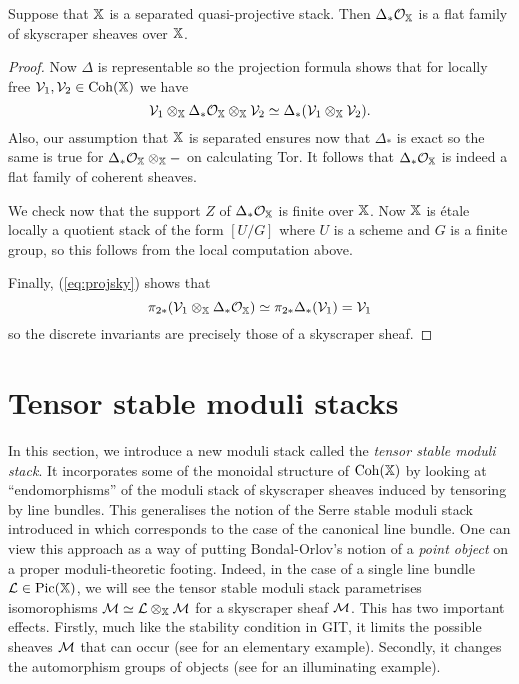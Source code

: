 \documentclass[12pt]{amsart}
\begin{document}
\begin{proposition} \label{prop:universalsky}
Suppose that $\mathbb{X}$ is a separated quasi-projective stack. Then $\Delta_* \mathcal{O}_{\mathbb{X}}$ is a flat family of skyscraper sheaves over $\mathbb{X}$. 
\end{proposition}
\begin{proof}
Now $\Delta$ is representable so the projection formula shows that for locally free $\mathcal{V}_1,\mathcal{V}_2 \in \operatorname{Coh}(\mathbb{X})$ we have
\begin{equation} \mathcal{V}_1 \otimes_{\mathbb{X}} \Delta_* \mathcal{O}_{\mathbb{X}} \otimes_{\mathbb{X}} \mathcal{V}_2 \simeq \Delta_*(\mathcal{V}_1 \otimes_{\mathbb{X}} \mathcal{V}_2) .
\label{eq:projsky}
\end{equation}
Also, our assumption that $\mathbb{X}$ is separated ensures now that $\Delta_*$ is exact so the same is true for $\Delta_* \mathcal{O}_{\mathbb{X}} \otimes_{\mathbb{X}} -$ on calculating Tor. It follows that $\Delta_* \mathcal{O}_{\mathbb{X}}$ is indeed a flat family of coherent sheaves. 

We check now that the support $Z$ of $\Delta_* \mathcal{O}_{\mathbb{X}}$ is finite over $\mathbb{X}$. Now $\mathbb{X}$ is \'etale locally  a quotient stack of the form $[U/G]$ where $U$ is a scheme and $G$ is a finite group, so this follows from the local computation above. 

Finally, (\ref{eq:projsky}) shows that 
$$ \pi_{2*} (\mathcal{V}_1 \otimes_{\mathbb{X}} \Delta_* \mathcal{O}_{\mathbb{X}})
\simeq \pi_{2*} \Delta_*(\mathcal{V}_1) = \mathcal{V}_1
$$
so the discrete invariants are precisely those of a skyscraper sheaf. 
\end{proof}

\section{Tensor stable moduli stacks} \label{sc:equaliserstack}

In this section, we introduce a new moduli stack called the {\em tensor stable moduli stack}. It incorporates some of the monoidal structure of $\operatorname{Coh}(\mathbb{X})$ by looking at ``endomorphisms'' of the moduli stack of skyscraper sheaves induced by tensoring by line bundles. This generalises the notion of the Serre stable moduli stack introduced in \cite{CL} which corresponds to the case of the canonical line bundle. One can view this approach as a way of putting Bondal-Orlov's notion \cite{BO} of a {\em point object} on a proper moduli-theoretic footing. Indeed, in the case of a single line bundle $\mathcal{L} \in \operatorname{Pic}(\mathbb{X})$, we will see the tensor stable moduli stack parametrises isomorophisms $\mathcal{M} \simeq \mathcal{L} \otimes_{\mathbb{X}} \mathcal{M}$ for a skyscraper sheaf $\mathcal{M}$. This has two important effects. Firstly, much like the stability condition in GIT, it limits the possible sheaves $\mathcal{M}$ that can occur (see \cite[Example~7.3]{CL} for an elementary example). Secondly, it changes the automorphism groups of objects (see \cite[Proposition~4.1(iii)]{CL} for an illuminating example).
\end{document}
